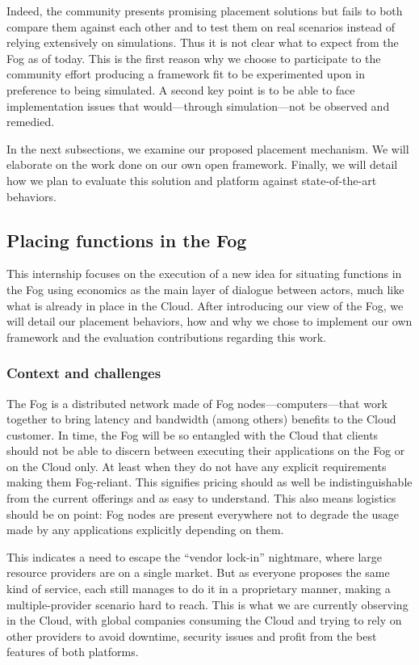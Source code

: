 Indeed, the community presents promising placement solutions but fails to both compare them against each other and to test them on real scenarios instead of relying extensively on simulations. Thus it is not clear what to expect from the Fog as of today. This is the first reason why we choose to participate to the community effort producing a framework fit to be experimented upon in preference to being simulated. A second key point is to be able to face implementation issues that would—through simulation—not be observed and remedied.

In the next subsections, we examine our proposed placement mechanism. We will elaborate on the work done on our own open framework. Finally, we will detail how we plan to evaluate this solution and platform against state-of-the-art behaviors.

\subsection{Placing functions in the Fog}

This internship focuses on the execution of a new idea for situating functions in the Fog using economics as the main layer of dialogue between actors, much like what is already in place in the Cloud. After introducing our view of the Fog, we will detail our placement behaviors, how and why we chose to implement our own framework and the evaluation contributions regarding this work.

\subsubsection{Context and challenges}

The Fog is a distributed network made of Fog nodes—computers—that work together to bring latency and bandwidth (among others) benefits to the Cloud customer. In time, the Fog will be so entangled with the Cloud that clients should not be able to discern between executing their applications on the Fog or on the Cloud only. At least when they do not have any explicit requirements making them Fog-reliant. This signifies pricing should as well be indistinguishable from the current offerings and as easy to understand. This also means logistics should be on point: Fog nodes are present everywhere not to degrade the usage made by any applications explicitly depending on them.

This indicates a need to escape the “vendor lock-in” nightmare, where large resource providers are on a single market. But as everyone proposes the same kind of service, each still manages to do it in a proprietary manner, making a multiple-provider scenario hard to reach. This is what we are currently observing in the Cloud, with global companies consuming the Cloud and trying to rely on other providers to avoid downtime, security issues and profit from the best features of both platforms.

